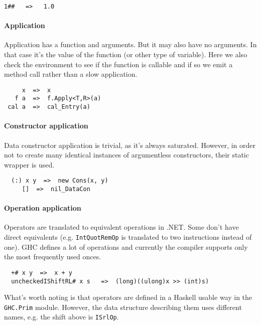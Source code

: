 \documentclass[en]{pracamgr}
\begin{document}
\begin{center}
\verb|1##   =>   1.0|
\end{center}

\paragraph{Application}
Application has a function and arguments. But it may also have no arguments.
In that case it's the value of the function (or other type of variable).
Here we also check the environment to see if the function is callable
and if so we emit a method call rather than a slow application.

\begin{center}
\verb|     x  =>  x               |\\
\verb|   f a  =>  f.Apply<T,R>(a) |\\
\verb| cal a  =>  cal_Entry(a)    |
\end{center}

\paragraph{Constructor application}
Data constructor application is trivial, as it's always saturated.
However, in order not to create many identical instances of argumentless
constructors, their static wrapper is used.

\begin{center}
\verb|  (:) x y  =>  new Cons(x, y)|\\
\verb|     []  =>  nil_DataCon  |
\end{center}

\paragraph{Operation application}
Operators are translated to equivalent operations in .NET. Some don't have
direct equivalents (e.g. \texttt{IntQuotRemOp} is translated to two instructions instead of one).
GHC defines a lot of operations and currently the compiler supports only the most frequently used onces.

\begin{center}
\verb|  +# x y  =>  x + y     |\\
\verb|  uncheckedIShiftRL# x s   =>  (long)((ulong)x >> (int)s)|
\end{center}

What's worth noting is that operators are defined in a Haskell usable way in
the \texttt{GHC.Prim} module. However, the data structure describing them
uses different names, e.g. the shift above is \texttt{ISrlOp}.
\end{document}
